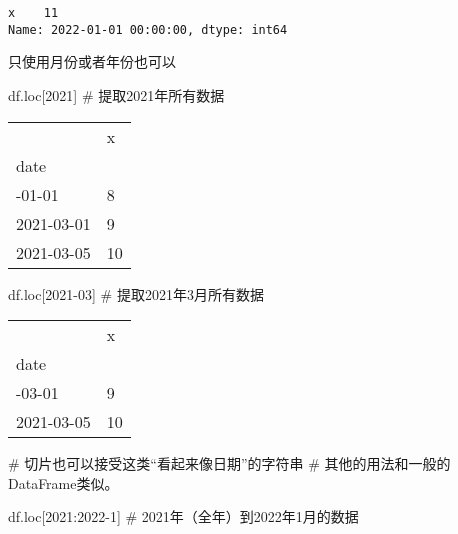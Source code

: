 \documentclass[
  letterpaper,
  DIV=11,
  numbers=noendperiod]{scrreprt}
\newenvironment{Shaded}{\begin{snugshade}}{\end{snugshade}}
\newcommand{\CommentTok}[1]{\textcolor[rgb]{0.37,0.37,0.37}{#1}}
\newcommand{\NormalTok}[1]{\textcolor[rgb]{0.00,0.23,0.31}{#1}}
\newcommand{\StringTok}[1]{\textcolor[rgb]{0.13,0.47,0.30}{#1}}
\begin{document}
\begin{verbatim}
x    11
Name: 2022-01-01 00:00:00, dtype: int64
\end{verbatim}

只使用月份或者年份也可以

\begin{Shaded}
\begin{Highlighting}[]

\NormalTok{df.loc[}\StringTok{\textquotesingle{}2021\textquotesingle{}}\NormalTok{] }\CommentTok{\# 提取2021年所有数据}
\end{Highlighting}
\end{Shaded}

\begin{longtable}[]{@{}ll@{}}
\toprule\noalign{}
& x \\
date & \\
\midrule\noalign{}
\endhead
\bottomrule\noalign{}
\endlastfoot
2021-01-01 & 8 \\
2021-03-01 & 9 \\
2021-03-05 & 10 \\
\end{longtable}

\begin{Shaded}
\begin{Highlighting}[]
\NormalTok{df.loc[}\StringTok{\textquotesingle{}2021{-}03\textquotesingle{}}\NormalTok{] }\CommentTok{\# 提取2021年3月所有数据}
\end{Highlighting}
\end{Shaded}

\begin{longtable}[]{@{}ll@{}}
\toprule\noalign{}
& x \\
date & \\
\midrule\noalign{}
\endhead
\bottomrule\noalign{}
\endlastfoot
2021-03-01 & 9 \\
2021-03-05 & 10 \\
\end{longtable}

\begin{Shaded}
\begin{Highlighting}[]
\CommentTok{\# 切片也可以接受这类“看起来像日期”的字符串}
\CommentTok{\# 其他的用法和一般的DataFrame类似。}

\NormalTok{df.loc[}\StringTok{\textquotesingle{}2021\textquotesingle{}}\NormalTok{:}\StringTok{\textquotesingle{}2022{-}1\textquotesingle{}}\NormalTok{] }\CommentTok{\# 2021年（全年）到2022年1月的数据}
\end{Highlighting}
\end{Shaded}
\end{document}
